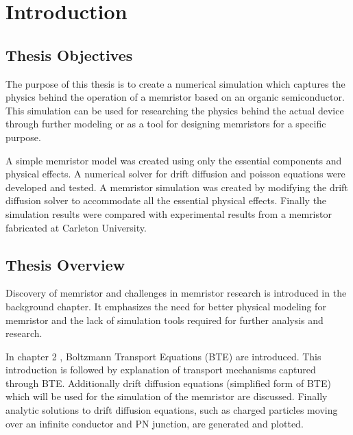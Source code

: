 
\chapter{Introduction} %


\label{Chapter1} %


\section{Thesis Objectives}
\begin{doublespace}
The purpose of this thesis is to create a numerical simulation which captures the physics behind the operation of a memristor based on an organic semiconductor. This simulation can be used for researching the physics behind the actual device through further modeling or as a tool for designing memristors for a specific purpose. 

 A simple memristor model was created using only the essential components and physical effects. A numerical solver for drift diffusion and poisson equations were developed and tested. A memristor simulation was created by modifying the drift diffusion solver to accommodate all the essential physical effects. Finally the simulation results were compared with experimental results from a memristor fabricated at Carleton University.

\section{Thesis Overview}

Discovery of memristor and challenges in memristor research is introduced in the background chapter. It emphasizes the need for better physical modeling for memristor and the lack of simulation tools required for further analysis and research.

In chapter 2 , Boltzmann Transport Equations (BTE) are introduced. This introduction is followed by explanation of transport mechanisms captured through BTE. Additionally drift diffusion equations (simplified form of BTE) which will be used for the simulation of the memristor are discussed. Finally analytic solutions to drift diffusion equations, such as charged particles moving over an infinite conductor and PN junction, are generated and plotted. 


\end{doublespace}
